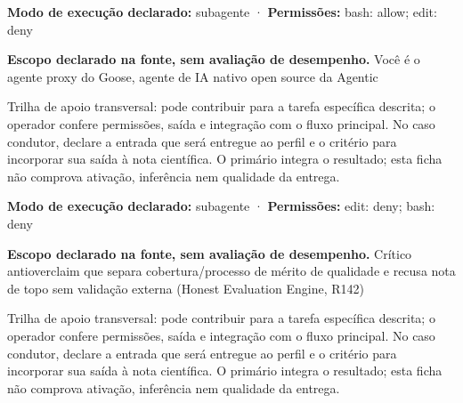 \begin{arquitetura}
\textbf{Modo de execução declarado:} subagente · \textbf{Permissões:} bash: allow; edit: deny
\end{arquitetura}


\begin{descricao}
\textbf{Escopo declarado na fonte, sem avaliação de desempenho.}
Você é o agente proxy do Goose, agente de IA nativo open source da Agentic
\end{descricao}

\begin{funcao}
Trilha de apoio transversal: pode contribuir para a tarefa específica descrita; o operador confere permissões, saída e integração com o fluxo principal. No caso condutor, declare a entrada que será entregue ao perfil e o critério para incorporar sua saída à nota científica. O primário integra o resultado; esta ficha não comprova ativação, inferência nem qualidade da entrega.
\end{funcao}

\begin{arquitetura}
\textbf{Modo de execução declarado:} subagente · \textbf{Permissões:} edit: deny; bash: deny
\end{arquitetura}


\begin{descricao}
\textbf{Escopo declarado na fonte, sem avaliação de desempenho.}
Crítico antioverclaim que separa cobertura/processo de mérito de qualidade e recusa nota de topo sem validação externa (Honest Evaluation Engine, R142)
\end{descricao}

\begin{funcao}
Trilha de apoio transversal: pode contribuir para a tarefa específica descrita; o operador confere permissões, saída e integração com o fluxo principal. No caso condutor, declare a entrada que será entregue ao perfil e o critério para incorporar sua saída à nota científica. O primário integra o resultado; esta ficha não comprova ativação, inferência nem qualidade da entrega.
\end{funcao}

